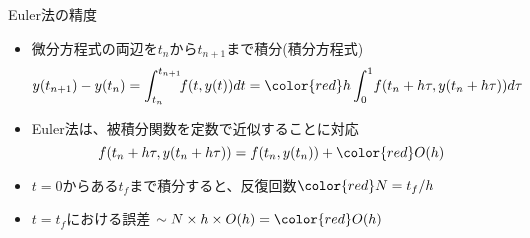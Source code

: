 \begin{frame}[t,fragile]{Euler法の精度}
  \begin{itemize}
  \item 微分方程式の両辺を$t_n$から$t_{n+1}$まで積分(積分方程式)
    \[
    y(t_{n+1}) - y(t_n) = \int^{t_{n+1}}_{t_n} \!\! f(t, y(t)) dt = {\color{red} h} \int^1_0 \! f(t_n+h\tau, y(t_n+h\tau)) d\tau
    \]
  \item Euler法は、被積分関数を定数で近似することに対応
    \[
    f(t_n+h\tau, y(t_n+h\tau)) = f(t_n, y(t_n)) + {\color{red} O(h)}
    \]
  \item $t=0$からある$t_f$まで積分すると、反復回数${\color{red} N = t_f / h}$
  \item $t=t_f$における誤差 $\sim N \times h \times O(h) = {\color{red} O(h)}$
  \end{itemize}
\end{frame}
